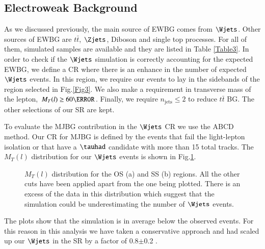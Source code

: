 \subsection{Electroweak Background}
As we discussed previously, the main source of EWBG comes from $\Wjets$. Other sources of EWBG are $t\bar{t}$, $\Zjets$, Diboson and single top processes. For all of them, simulated samples are available and they are listed in Table \ref{Table3}. In order to check if the $\Wjets$  simulation is correctly accounting for the expected EWBG, we define a CR where there is an enhance in the number of expected $\Wjets$ events. In this region, we require our events to lay in the sidebands of the region selected in Fig.\ref{Fig3}. We also make a requirement in transverse mass of the lepton, $M_T(l)\ge 60 \GeV$. Finally, we require $n_{\text{jets}}\le 2$ to reduce $t\bar{t}$ BG. The other selections of our SR are kept.

To evaluate the MJBG contribution in the $\Wjets$ CR we use the ABCD method. Our CR for MJBG is defined by the events that fail the light-lepton isolation or that have a $\tauhad$ candidate with more than 15 total tracks. The  $M_T(l)$ distribution for our $\Wjets$ events is shown in Fig.\ref{Fig8}. 
\begin{figure}[htbp]
	\centering
	\hfill
	\caption{$M_T(l)$ distribution for the OS (a) and SS (b) regions. All the other cuts have been applied apart from the one being plotted. There is an excess of the data in this distribution which suggest that the simulation could be underestimating the number of $\Wjets$ events.}
	\label{Fig8}
\end{figure} 
The plots show that the simulation is in average below the observed events. For this reason in this analysis we have taken a conservative approach and had scaled up our $\Wjets$ in the SR by a factor of 0.8$\pm$0.2 .